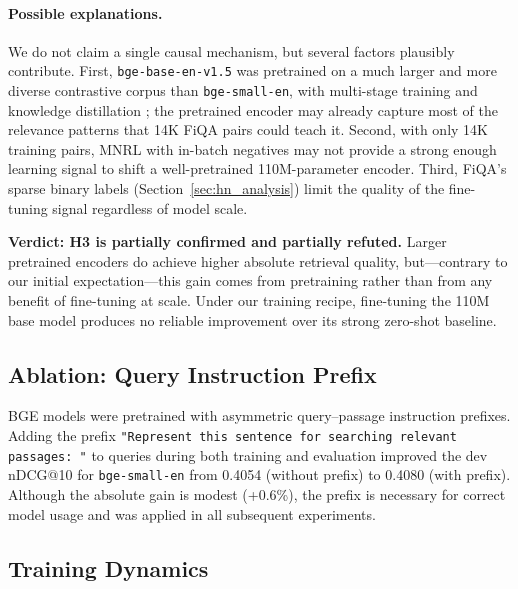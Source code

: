 \documentclass{article} %
\begin{document}
\paragraph{Possible explanations.}
We do not claim a single causal mechanism, but several factors plausibly contribute.
First, \texttt{bge-base-en-v1.5} was pretrained on a much larger and more diverse contrastive corpus than \texttt{bge-small-en}, with multi-stage training and knowledge distillation \citep{xiao2023cpack,flagembedding2023}; the pretrained encoder may already capture most of the relevance patterns that 14K FiQA pairs could teach it.
Second, with only 14K training pairs, MNRL with in-batch negatives may not provide a strong enough learning signal to shift a well-pretrained 110M-parameter encoder.
Third, FiQA's sparse binary labels (Section~\ref{sec:hn_analysis}) limit the quality of the fine-tuning signal regardless of model scale.

\textbf{Verdict: H3 is partially confirmed and partially refuted.} Larger pretrained encoders do achieve higher absolute retrieval quality, but---contrary to our initial expectation---this gain comes from pretraining rather than from any benefit of fine-tuning at scale. Under our training recipe, fine-tuning the 110M base model produces no reliable improvement over its strong zero-shot baseline.

\subsection{Ablation: Query Instruction Prefix}

BGE models were pretrained with asymmetric query--passage instruction prefixes.
Adding the prefix \texttt{"Represent this sentence for searching relevant passages: "} to queries during both training and evaluation improved the dev nDCG@10 for \texttt{bge-small-en} from 0.4054 (without prefix) to 0.4080 (with prefix).
Although the absolute gain is modest (+0.6\%), the prefix is necessary for correct model usage and was applied in all subsequent experiments.

\subsection{Training Dynamics}
\label{sec:training_dynamics}
\end{document}
